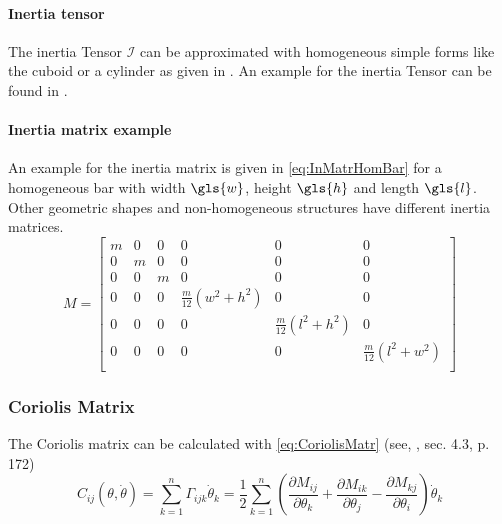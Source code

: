 \paragraph{Inertia tensor}
The inertia Tensor
 $\mathcal{I}$ 
can be approximated with homogeneous simple forms like the cuboid or a cylinder as given in \cite{PhysScientEng}. 
An example for the inertia Tensor can be found in \cite{MathIntroRobManip}. 

\paragraph{Inertia matrix example}
An example for the inertia matrix is given in \ref{eq:InMatrHomBar} for a homogeneous bar with width $\gls{w}$, height $\gls{h}$ and length $\gls{l}$. Other geometric shapes and non-homogeneous structures have different inertia matrices. 
\begin{equation} \label{eq:InMatrHomBar}
	M=
	\begin{bmatrix}
	m & 0 & 0 & 0 & 0 & 0\\
	0 & m & 0 & 0 & 0 & 0\\
	0 & 0 & m & 0 & 0 & 0\\
	0 & 0 & 0 & \frac{m}{12}(w^2 + h^2) & 0 & 0\\
	0 & 0 & 0 & 0 & \frac{m}{12}(l^2+h^2) & 0\\
	0 & 0 & 0 & 0 & 0 & \frac{m}{12}(l^2 +w^2)\\
	\end{bmatrix}
\end{equation}


%
%	


\subsubsection{Coriolis Matrix}
The Coriolis matrix can be calculated with \ref{eq:CoriolisMatr} (see, \cite{MathIntroRobManip}, sec. 4.3, p. 172)
\begin{equation}\label{eq:CoriolisMatr}
	C_{ij}(\theta,\dot{\theta}) = \sum_{k=1}^{n} \Gamma_{ijk}\dot{\theta}_k=\frac{1}{2} \sum_{k=1}^{n} (\frac{\partial M_{ij}}{\partial\theta_k}+\frac{\partial M_{ik}}{\partial\theta_j}-\frac{\partial M_{kj}}{\partial\theta_i})\dot{\theta}_k
\end{equation}

